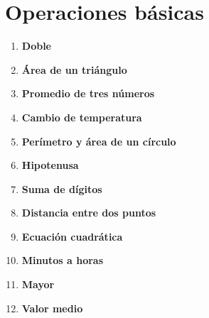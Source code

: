 \section{Operaciones básicas}
\begin{enumerate}
    \item \textbf{Doble}\\
    
    
    \item \textbf{Área de un triángulo}\\
    

    \item \textbf{Promedio de tres números}\\
    

    \item \textbf{Cambio de temperatura}\\
    

    \item \textbf{Perímetro y área de un círculo}\\
    

    \item \textbf{Hipotenusa}\\
    

    \item \textbf{Suma de dígitos}\\
    
    
    \item \textbf{Distancia entre dos puntos}\\
    

    \item \textbf{Ecuación cuadrática}\\
    

    \item \textbf{Minutos a horas}\\
    
    
    \item \textbf{Mayor}\\
    
    
    \item \textbf{Valor medio}\\
    
        

\end{enumerate}
